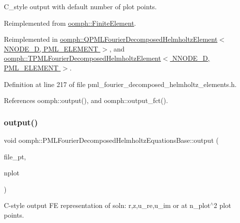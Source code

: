 C\+\_\+style output with default number of plot points. 



Reimplemented from \hyperlink{classoomph_1_1FiniteElement_a72cddd09f8ddbee1a20a1ff404c6943e}{oomph\+::\+Finite\+Element}.



Reimplemented in \hyperlink{classoomph_1_1QPMLFourierDecomposedHelmholtzElement_ade1081cf429f5dd7c90e83ef924f9bea}{oomph\+::\+Q\+P\+M\+L\+Fourier\+Decomposed\+Helmholtz\+Element$<$ N\+N\+O\+D\+E\+\_\+D, P\+M\+L\+\_\+\+E\+L\+E\+M\+E\+N\+T $>$}, and \hyperlink{classoomph_1_1TPMLFourierDecomposedHelmholtzElement_a9fa5832723310e96902398d74e43313f}{oomph\+::\+T\+P\+M\+L\+Fourier\+Decomposed\+Helmholtz\+Element$<$ N\+N\+O\+D\+E\+\_\+D, P\+M\+L\+\_\+\+E\+L\+E\+M\+E\+N\+T $>$}.



Definition at line 217 of file pml\+\_\+fourier\+\_\+decomposed\+\_\+helmholtz\+\_\+elements.\+h.



References oomph\+::output(), and oomph\+::output\+\_\+fct().

\mbox{\label{classoomph_1_1PMLFourierDecomposedHelmholtzEquationsBase_a030cedd092d7824d8bc060f960fef3d2}} 
\subsubsection{\texorpdfstring{output()}{output()}\hspace{0.1cm}{\footnotesize\ttfamily [4/4]}}
{\footnotesize\ttfamily void oomph\+::\+P\+M\+L\+Fourier\+Decomposed\+Helmholtz\+Equations\+Base\+::output (\begin{DoxyParamCaption}\item[{F\+I\+LE $\ast$}]{file\+\_\+pt,  }\item[{const unsigned \&}]{nplot }\end{DoxyParamCaption})\hspace{0.3cm}{\ttfamily [virtual]}}



C-\/style output FE representation of soln\+: r,z,u\+\_\+re,u\+\_\+im or at n\+\_\+plot$^\wedge$2 plot points. 

